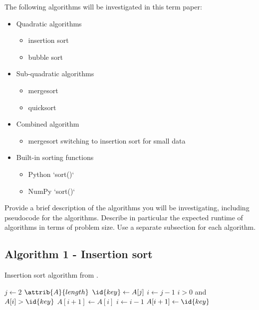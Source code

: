 \documentclass[sigconf, nonacm, natbib, screen, balance=False]{acmart}
\begin{document}
The following algorithms will be investigated in this term paper:
\begin{itemize}
\item Quadratic algorithms
  \begin{itemize}
  \item insertion sort
  \item bubble sort
  \end{itemize}
\item Sub-quadratic algorithms
  \begin{itemize}
  \item mergesort
  \item quicksort
  \end{itemize}
\item Combined algorithm
  \begin{itemize}
  \item mergesort switching to insertion sort for small data
  \end{itemize}
\item Built-in sorting functions
  \begin{itemize}
  \item Python `sort()`
  \item NumPy `sort()`
  \end{itemize}
\end{itemize}

Provide a brief description of the algorithms you will be
investigating, including pseudocode for the algorithms. Describe in
particular the expected runtime of algorithms in terms of problem
size.  Use a separate subsection for each algorithm.

\subsection{Algorithm 1 - Insertion sort}\label{sec:algo1}

\begin{listing}
  \caption{Insertion sort algorithm from \citet[Ch.~2.1]{CLRS_2009}.}
  \label{lst:insertion_algo}
  \begin{codebox}
    \li \For $j \gets 2$ \To $\attrib{A}{length}$
    \li \Do
    $\id{key} \gets A[j]$
    \li     $i \gets j-1$
    \li      \While $i>0$ and $A[i] > \id{key}$
    \li      \Do
    $A[i+1] \gets A[i]$
    \li         $i \gets i-1$
    \End    
    \li       $A[i+1]\gets \id{key}$
    \End
  \end{codebox}
\end{listing}
\end{document}
